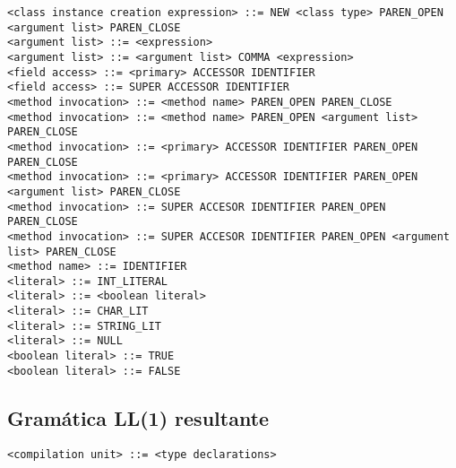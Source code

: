 \documentclass [a4paper,abstracton,titlepage]{scrartcl}
\begin{document}
\begin{lstlisting}
<class instance creation expression> ::= NEW <class type> PAREN_OPEN <argument list> PAREN_CLOSE
<argument list> ::= <expression>
<argument list> ::= <argument list> COMMA <expression>
<field access> ::= <primary> ACCESSOR IDENTIFIER
<field access> ::= SUPER ACCESSOR IDENTIFIER
<method invocation> ::= <method name> PAREN_OPEN PAREN_CLOSE
<method invocation> ::= <method name> PAREN_OPEN <argument list> PAREN_CLOSE
<method invocation> ::= <primary> ACCESSOR IDENTIFIER PAREN_OPEN PAREN_CLOSE
<method invocation> ::= <primary> ACCESSOR IDENTIFIER PAREN_OPEN <argument list> PAREN_CLOSE
<method invocation> ::= SUPER ACCESOR IDENTIFIER PAREN_OPEN PAREN_CLOSE
<method invocation> ::= SUPER ACCESOR IDENTIFIER PAREN_OPEN <argument list> PAREN_CLOSE
<method name> ::= IDENTIFIER
<literal> ::= INT_LITERAL
<literal> ::= <boolean literal>
<literal> ::= CHAR_LIT
<literal> ::= STRING_LIT
<literal> ::= NULL
<boolean literal> ::= TRUE
<boolean literal> ::= FALSE
\end{lstlisting}

\hypertarget{_gramática_ll_1_resultante}{}
\subsection{Gramática LL(1) resultante}
\label{_gramática_ll_1_resultante}
\begin{lstlisting}
<compilation unit> ::= <type declarations>
\end{lstlisting}
\end{document}
